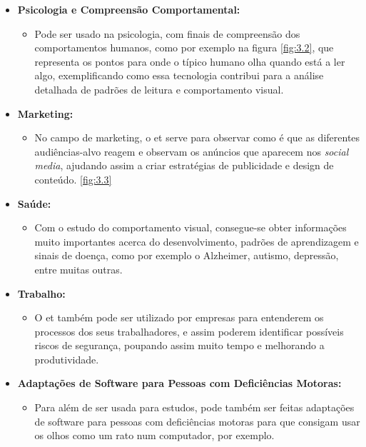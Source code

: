 \documentclass{report}
\begin{document}
\begin{itemize}
    \item \textbf{Psicologia e Compreensão Comportamental:}

        \begin{itemize}
        \item Pode ser usado na psicologia, com finais de compreensão dos comportamentos humanos, como por exemplo na figura \ref{fig:3.2}, que representa os pontos para onde o típico humano olha quando está a ler algo, exemplificando como essa tecnologia contribui para a análise detalhada de padrões de leitura e comportamento visual. \cite{EEG&ET_reading}
        \end{itemize}
\end{itemize}
\begin{itemize}
    \item \textbf{Marketing:}

    \begin{itemize}
        \item    No campo de marketing, o \ac{et} serve para observar como é que as diferentes audiências-alvo reagem e observam os anúncios que aparecem nos \textit{social media}, ajudando assim a criar estratégias de publicidade e design de conteúdo. \cite{ET_Pesquisas} \ref{fig:3.3}
    \end{itemize}
\end{itemize}
\begin{itemize}
    \item \textbf{Saúde:}    
        \begin{itemize}
        \item Com o estudo do comportamento visual, consegue-se obter informações muito importantes acerca do desenvolvimento, padrões de aprendizagem e sinais de doença, como por exemplo o Alzheimer, autismo, depressão, entre muitas outras.
    \end{itemize}
    
\end{itemize}
\begin{itemize}
    \item \textbf{Trabalho:}
    \begin{itemize}
        \item O \ac{et} também pode ser utilizado por empresas para entenderem os processos dos seus trabalhadores, e assim poderem identificar possíveis riscos de segurança, poupando assim muito tempo e melhorando a produtividade.
    \end{itemize}
\end{itemize}
\begin{itemize}
    \item \textbf{Adaptações de Software para Pessoas com Deficiências Motoras:}
    \begin{itemize}
        \item Para além de ser usada para estudos, pode também ser feitas adaptações de software para pessoas com deficiências motoras para que consigam usar os olhos como um rato num computador, por exemplo.
    \end{itemize}
\end{itemize}
\clearpage
\end{document}

